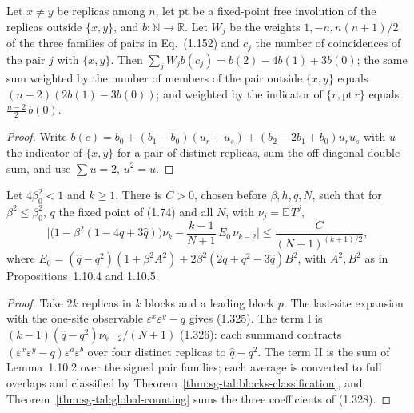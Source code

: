 \begin{theorem}
\label{thm:sg-tal:global-counting}
\leanok
{}
Let $x\ne y$ be replicas among $n$, let $\mathrm{pt}$ be a fixed-point free involution of the replicas
outside $\{x,y\}$, and $b:\mathbb N\to\mathbb R$. Let $W_j$ be the weights $1,-n,n(n+1)/2$ of the three
families of pairs in Eq.~(1.152) and $c_j$ the number of coincidences of the pair $j$ with $\{x,y\}$.
Then $\sum_jW_jb(c_j)=b(2)-4b(1)+3b(0)$; the same sum weighted by the number of members of the pair
outside $\{x,y\}$ equals $(n-2)(2b(1)-3b(0))$; and weighted by the indicator of $\{r,\mathrm{pt}\,r\}$
equals $\tfrac{n-2}2\,b(0)$.
\end{theorem}
\begin{proof}
\leanok
Write $b(c)=b_0+(b_1-b_0)(u_r+u_s)+(b_2-2b_1+b_0)u_ru_s$ with $u$ the indicator of $\{x,y\}$ for a
pair of distinct replicas, sum the off-diagonal double sum, and use $\sum u=2$, $u^2=u$.
\end{proof}

\begin{theorem}
\label{thm:sg-tal:global-recurrence}
\leanok
{}
Let $4\beta_0^2<1$ and $k\ge1$. There is $C>0$, chosen before $\beta,h,q,N$, such that for
$\beta^2\le\beta_0^2$, $q$ the fixed point of (1.74) and all $N$, with $\nu_j=\mathbb E\,T^j$,
\[
 \Big|\big(1-\beta^2(1-4q+3\hat q)\big)\nu_k-\frac{k-1}{N+1}\,E_0\,\nu_{k-2}\Big|\le\frac{C}{(N+1)^{(k+1)/2}},
\]
where $E_0=(\hat q-q^2)(1+\beta^2A^2)+2\beta^2(2q+q^2-3\hat q)B^2$, with $A^2,B^2$ as in
Propositions~1.10.4 and 1.10.5.
\end{theorem}
\begin{proof}
\leanok
Take $2k$ replicas in $k$ blocks and a leading block $p$. The last-site expansion with the one-site
observable $\varepsilon^x\varepsilon^y-q$ gives (1.325). The term I is $(k-1)(\hat q-q^2)\nu_{k-2}/(N+1)$
(1.326): each summand contracts $(\varepsilon^x\varepsilon^y-q)\varepsilon^a\varepsilon^b$ over four distinct
replicas to $\hat q-q^2$. The term II is the sum of Lemma~1.10.2 over the signed pair families; each
average is converted to full overlaps and classified by Theorem~\ref{thm:sg-tal:blocks-classification},
and Theorem~\ref{thm:sg-tal:global-counting} sums the three coefficients of (1.328).
\end{proof}

